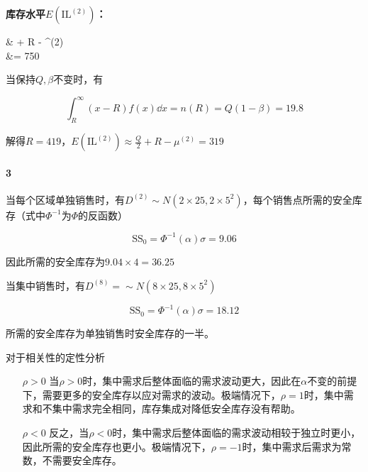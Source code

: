 \documentclass{../notes}
\begin{document}
\begin{subquestions}
        \textbf{库存水平$E\left(\mathrm {IL}^{(2)}\right)$：}

        \begin{derive}
            &\approx {} + R - \mu^{(2)} \\
            &= 750
        \end{derive}

        \item 当保持$Q, \beta$不变时，有

        \begin{equation}
            \int_R ^\infty (x-R)f(x) \dd x = n(R) = Q(1 - \beta) = 19.8
        \end{equation}

        解得$R = 419$，$E\left(\mathrm{IL}^{(2)}\right)\approx \frac{Q}{2} + R - \mu^{(2)}=319$
    \end{subquestions}

    \paragraph*{3} 当每个区域单独销售时，有$D^{(2)}\sim N\left(2\times 25, 2\times 5^2\right)$，每个销售点所需的安全库存（式中$\Phi^{-1}$为$\Phi$的反函数）

    \begin{equation}
        \mathrm {SS}_{0} = \Phi^{-1}(\alpha) \sigma = 9.06
    \end{equation}

    因此所需的安全库存为$9.04\times 4 = 36.25$

    当集中销售时，有$D^{(8)} = \sim N\left(8\times 25, 8\times 5^2\right)$

    \begin{equation}
        \mathrm {SS}_{0} = \Phi^{-1}(\alpha) \sigma = 18.12
    \end{equation}

    所需的安全库存为单独销售时安全库存的一半。

    对于相关性的定性分析

    \begin{enumerate}
        \item[$\rho > 0$] 当$\rho > 0$时，集中需求后整体面临的需求波动更大，因此在$\alpha$不变的前提下，需要更多的安全库存以应对需求的波动。极端情况下，$\rho = 1$时，集中需求和不集中需求完全相同，库存集成对降低安全库存没有帮助。
        \item[$\rho < 0$] 反之，当$\rho < 0$时，集中需求后整体面临的需求波动相较于独立时更小，因此所需的安全库存也更小。极端情况下，$\rho = -1$时，集中需求后需求为常数，不需要安全库存。
    \end{enumerate}
\end{document}
